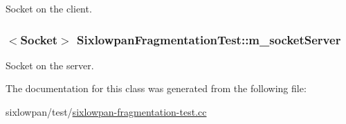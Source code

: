 Socket on the client. 

\subsubsection[{\texorpdfstring{m\+\_\+socket\+Server}{m_socketServer}}]{$<${\bf Socket}$>$ Sixlowpan\+Fragmentation\+Test\+::m\+\_\+socket\+Server\hspace{0.3cm}{\ttfamily [private]}}\hypertarget{classSixlowpanFragmentationTest_a385f27651f5ad9a16d8c8327a65abef9}{}\label{classSixlowpanFragmentationTest_a385f27651f5ad9a16d8c8327a65abef9}


Socket on the server. 



The documentation for this class was generated from the following file\+:\begin{DoxyCompactItemize}
\item 
sixlowpan/test/\hyperlink{sixlowpan-fragmentation-test_8cc}{sixlowpan-\/fragmentation-\/test.\+cc}\end{DoxyCompactItemize}
